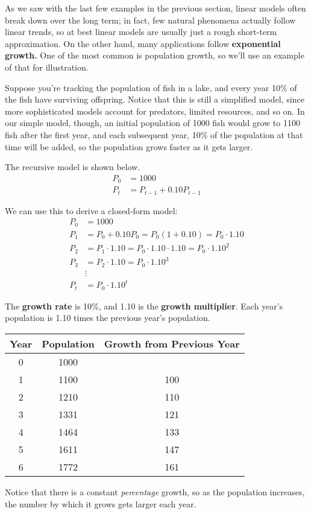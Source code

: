 \setcounter{ExampleCounter}{1}
As we saw with the last few examples in the previous section, linear models often break down over the long term; in fact, few natural phenomena actually follow linear trends, so at best linear models are usually just a rough short-term approximation.  On the other hand, many applications follow \textbf{exponential growth.}  One of the most common is population growth, so we'll use an example of that for illustration.

Suppose you're tracking the population of fish in a lake, and every year 10\% of the fish have surviving offspring.  Notice that this is still a simplified model, since more sophisticated models account for predators, limited resources, and so on.  In our simple model, though, an initial population of 1000 fish would grow to 1100 fish after the first year, and each subsequent year, 10\% of the population at that time will be added, so the population grows faster as it gets larger.

The recursive model is shown below.
\begin{align*}
P_0 &= 1000\\
P_t &= P_{t-1} + 0.10P_{t-1}
\end{align*}

We can use this to derive a closed-form model:
\begin{align*}
P_0 &= 1000\\
P_1 &= P_0 + 0.10P_0 = P_0(1+0.10) = P_0 \cdot 1.10\\
P_2 &= P_1 \cdot 1.10 = P_0 \cdot 1.10 \cdot 1.10 = P_0 \cdot 1.10^2\\
P_3 &= P_2 \cdot 1.10 = P_0 \cdot 1.10^3\\
&\vdots\\
P_t &= P_0 \cdot 1.10^t
\end{align*}

The \textbf{growth rate} is 10\%, and 1.10 is the \textbf{growth multiplier}.  Each year's population is 1.10 times the previous year's population.

\begin{center}
\begin{tabular}{c | c | c}
\textbf{Year} & \textbf{Population} & \textbf{Growth from Previous Year}\\
\hline
0 & 1000 &\\
1 & 1100 & 100\\
2 & 1210 & 110\\
3 & 1331 & 121\\
4 & 1464 & 133\\
5 & 1611 & 147\\
6 & 1772 & 161
\end{tabular}
\end{center}
Notice that there is a constant \textit{percentage} growth, so as the population increases, the number by which it grows gets larger each year.\\

